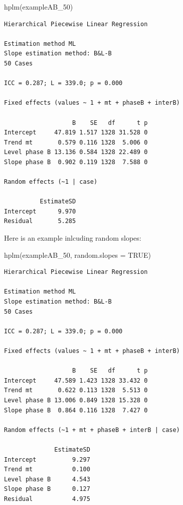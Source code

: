 \documentclass[
]{book}
\newenvironment{Shaded}{\begin{snugshade}}{\end{snugshade}}
\newcommand{\AttributeTok}[1]{\textcolor[rgb]{0.77,0.63,0.00}{#1}}
\newcommand{\ConstantTok}[1]{\textcolor[rgb]{0.00,0.00,0.00}{#1}}
\newcommand{\FunctionTok}[1]{\textcolor[rgb]{0.00,0.00,0.00}{#1}}
\newcommand{\NormalTok}[1]{#1}
\begin{document}
\begin{Shaded}
\begin{Highlighting}[]
\FunctionTok{hplm}\NormalTok{(exampleAB\_50)}
\end{Highlighting}
\end{Shaded}

\begin{verbatim}
Hierarchical Piecewise Linear Regression

Estimation method ML 
Slope estimation method: B&L-B 
50 Cases

ICC = 0.287; L = 339.0; p = 0.000

Fixed effects (values ~ 1 + mt + phaseB + interB)

                   B    SE   df      t p
Intercept     47.819 1.517 1328 31.528 0
Trend mt       0.579 0.116 1328  5.006 0
Level phase B 13.136 0.584 1328 22.489 0
Slope phase B  0.902 0.119 1328  7.588 0

Random effects (~1 | case)

          EstimateSD
Intercept      9.970
Residual       5.285
\end{verbatim}

Here is an example inlcuding random slopes:

\begin{Shaded}
\begin{Highlighting}[]
\FunctionTok{hplm}\NormalTok{(exampleAB\_50, }\AttributeTok{random.slopes =} \ConstantTok{TRUE}\NormalTok{)}
\end{Highlighting}
\end{Shaded}

\begin{verbatim}
Hierarchical Piecewise Linear Regression

Estimation method ML 
Slope estimation method: B&L-B 
50 Cases

ICC = 0.287; L = 339.0; p = 0.000

Fixed effects (values ~ 1 + mt + phaseB + interB)

                   B    SE   df      t p
Intercept     47.589 1.423 1328 33.432 0
Trend mt       0.622 0.113 1328  5.513 0
Level phase B 13.006 0.849 1328 15.328 0
Slope phase B  0.864 0.116 1328  7.427 0

Random effects (~1 + mt + phaseB + interB | case)

              EstimateSD
Intercept          9.297
Trend mt           0.100
Level phase B      4.543
Slope phase B      0.127
Residual           4.975
\end{verbatim}
\end{document}
